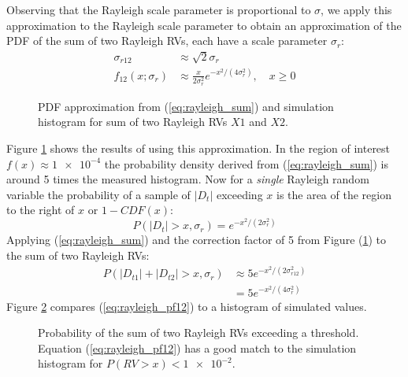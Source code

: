 \documentclass{article}
\begin{document}
Observing that the Rayleigh scale parameter is proportional to $\sigma$, we apply this approximation to the Rayleigh scale parameter to obtain an approximation of the PDF of the sum of two Rayleigh RVs, each have a scale parameter $\sigma_r$:
\begin{equation}
\begin{split}
\label{eq:rayleigh_sum}
\sigma_{r12} &\approx \sqrt{2}\sigma_r \\
f_{12}(x;\sigma_r ) &\approx {\frac {x}{2\sigma_r ^{2}}}e^{-x^{2}/(4\sigma_r ^{2})},\quad x\geq 0
\end{split}
\end{equation}

\begin{figure}[H]
\caption{PDF approximation from (\ref{eq:rayleigh_sum}) and simulation histogram for sum of two Rayleigh RVs $X1$ and $X2$.}
\label{fig:rayleigh_sum_pdf}
\begin{center}

\end{center}
\end{figure}

Figure \ref{fig:rayleigh_sum_pdf} shows the results of using this approximation. In the region of interest $f(x)\approx\num{1e-4}$ the probability density derived from (\ref{eq:rayleigh_sum}) is around 5 times the measured histogram.  Now for a \emph{single} Rayleigh random variable the probability of a sample of $|D_t|$ exceeding $x$ is the area of the region to the right of $x$ or $1-CDF(x)$:
\begin{equation}
\label{eq:rayleigh_pf}
P(|D_t|>x,\sigma_r) = e^{-x^2/(2\sigma_r^2)}
\end{equation}
Applying (\ref{eq:rayleigh_sum}) and the correction factor of 5 from Figure (\ref{fig:rayleigh_sum_pdf}) to the sum of two Rayleigh RVs:
\begin{equation}
\label{eq:rayleigh_pf12}
\begin{split}
P(|D_{t1}|+|D_{t2}| > x,\sigma_r) &\approx 5e^{-x^2/(2\sigma_{r12}^2)} \\
                                  &= 5e^{-x^2/(4\sigma_r^2)}
\end{split}
\end{equation}
Figure \ref{fig:rayleigh_sum} compares (\ref{eq:rayleigh_pf12}) to a histogram of simulated values.

\begin{figure}[H]
\caption{Probability of the sum of two Rayleigh RVs exceeding a threshold. Equation (\ref{eq:rayleigh_pf12}) has a good match to the simulation histogram for $P(RV>x)<\num{1e-2}$.}
\label{fig:rayleigh_sum}
\begin{center}

\end{center}
\end{figure}
\end{document}
